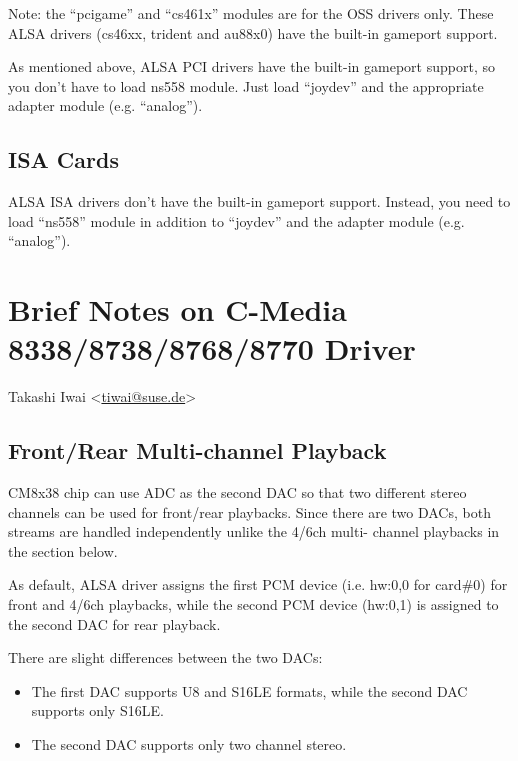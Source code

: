 \documentclass[a4paper,8pt,english]{sphinxmanual}
\begin{document}
Note: the ``pcigame'' and ``cs461x'' modules are for the OSS drivers only.
These ALSA drivers (cs46xx, trident and au88x0) have the
built-in gameport support.

As mentioned above, ALSA PCI drivers have the built-in gameport
support, so you don't have to load ns558 module.  Just load ``joydev''
and the appropriate adapter module (e.g. ``analog'').


\subsection{ISA Cards}
\label{sound/cards/joystick:isa-cards}
ALSA ISA drivers don't have the built-in gameport support.
Instead, you need to load ``ns558'' module in addition to ``joydev'' and
the adapter module (e.g. ``analog'').


\section{Brief Notes on C-Media 8338/8738/8768/8770 Driver}
\label{sound/cards/cmipci:brief-notes-on-c-media-8338-8738-8768-8770-driver}\label{sound/cards/cmipci::doc}
Takashi Iwai \textless{}\href{mailto:tiwai@suse.de}{tiwai@suse.de}\textgreater{}


\subsection{Front/Rear Multi-channel Playback}
\label{sound/cards/cmipci:front-rear-multi-channel-playback}
CM8x38 chip can use ADC as the second DAC so that two different stereo
channels can be used for front/rear playbacks.  Since there are two
DACs, both streams are handled independently unlike the 4/6ch multi-
channel playbacks in the section below.

As default, ALSA driver assigns the first PCM device (i.e. hw:0,0 for
card\#0) for front and 4/6ch playbacks, while the second PCM device
(hw:0,1) is assigned to the second DAC for rear playback.

There are slight differences between the two DACs:
\begin{itemize}
\item {} 
The first DAC supports U8 and S16LE formats, while the second DAC
supports only S16LE.

\item {} 
The second DAC supports only two channel stereo.

\end{itemize}
\end{document}
